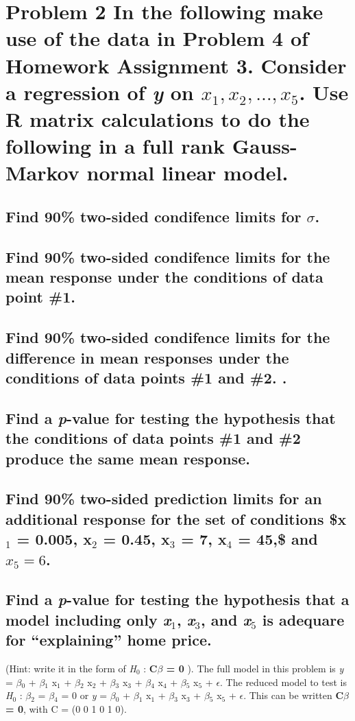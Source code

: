 \documentclass[11pt]{article}
\begin{document}
\section{Problem 2 In the following make use of the data in Problem 4 of Homework Assignment 3. Consider a regression of \emph{y} on $x_1, x_2,\ldots,x_5$. Use R matrix calculations to do the following in a full rank Gauss-Markov normal linear model.}
\label{sec-2}
\subsection{Find 90\% two-sided condifence limits for $\sigma$.}
\label{sec-2-1}
\subsection{Find 90\% two-sided condifence limits for the mean response under the conditions of data point \#1.}
\label{sec-2-2}
\subsection{Find 90\% two-sided condifence limits for the difference in mean responses under the conditions of data points \#1 and \#2. .}
\label{sec-2-3}
\subsection{Find a \emph{p}-value for testing the hypothesis that the conditions of data points \#1 and \#2 produce the same mean response.}
\label{sec-2-4}
\subsection{Find 90\% two-sided prediction limits for an additional response for the set of conditions \$x$_1$ = 0.005, x$_2$ = 0.45, x$_3$ = 7, x$_4$ = 45,\$ and $x_5 = 6$.}
\label{sec-2-5}
\subsection{Find a \emph{p}-value for testing the hypothesis that a model including only \emph{x$_1$}, \emph{x$_3$}, and \emph{x$_5$} is adequare for ``explaining'' home price.}
\label{sec-2-6}

(Hint: write it in the form of \emph{H$_0$} : \textbf{C$\beta$ = 0} ).
 The full model in this problem is \emph{y} = $\beta$$_0$ + $\beta$$_1$ x$_1$ +
 $\beta$$_2$ x$_2$ + $\beta$$_3$ x$_3$ + $\beta$$_4$ x$_4$ + $\beta$$_5$ x$_5$ + $\epsilon$. 
 The reduced model to test is \emph{H$_0$} : $\beta$$_2$ = $\beta$$_4$ = 0 or \emph{y} =
 $\beta$$_0$ + $\beta$$_1$ x$_1$ + $\beta$$_3$ x$_3$ + $\beta$$_5$ x$_5$ + $\epsilon$. This can be written \textbf{C$\beta$ = 0}, with C = (0 0 1 0 1 0).
\end{document}
